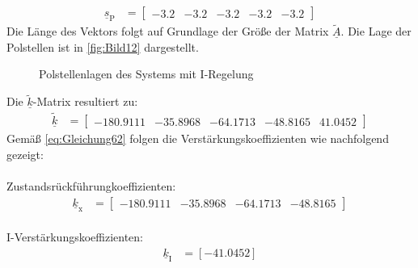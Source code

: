 \documentclass[
	pagesize,
	fontsize=12pt,
	paper=a4,
	oneside,
   reqno
]{scrartcl}
\begin{document}
\begin{align}\label{eq:Gleichung67}
    \underline{s}_{\mathrm{P}} &= 
    \begin{bmatrix}
        -3.2 & -3.2 & -3.2 & -3.2 & -3.2
    \end{bmatrix}
\end{align}
Die Länge des Vektors folgt auf Grundlage der Größe der Matrix $\underline{\tilde{A}}$. Die Lage der Polstellen ist in \autoref{fig:Bild12} dargestellt.
\begin{figure}[H]
    \centering
    \caption[Polstellenlage I-Regelung]{Polstellenlagen des Systems mit I-Regelung}
    \label{fig:Bild12}
\end{figure}
Die $\underline{\tilde{k}}$-Matrix resultiert zu:
\begin{align}\label{eq:Gleichung68}
    \underline{\tilde{k}} &= 
    \begin{bmatrix}
        -180.9111 & -35.8968 & -64.1713 & -48.8165 & 41.0452
    \end{bmatrix}
\end{align}
Gemäß \autoref{eq:Gleichung62} folgen die Verstärkungskoeffizienten wie nachfolgend gezeigt:\\\\
Zustandsrückführungkoeffizienten:
\begin{align}\label{eq:Gleichung69}
    \underline{k}_{\mathrm{x}} &= 
    \begin{bmatrix}
        -180.9111 & -35.8968 & -64.1713 & -48.8165
    \end{bmatrix}
\end{align}\\
I-Verstärkungskoeffizienten:
\begin{align}\label{eq:Gleichugn70}
    \underline{k}_{\mathrm{I}} &= [-41.0452]
\end{align}
\end{document}
